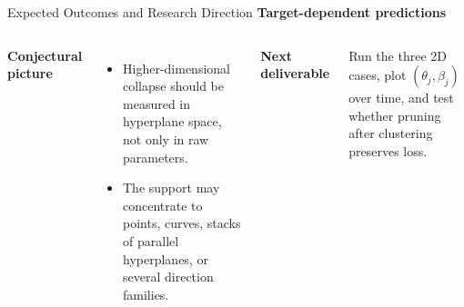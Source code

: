 \documentclass[aspectratio=169,10pt]{beamer}
\begin{document}
\begin{frame}{Expected Outcomes and Research Direction}
\small
\textbf{\textcolor{rtgnavy}{Target-dependent predictions}}

\vspace{0.05cm}
\begin{center}
\end{center}

\vspace{0.12cm}
\begin{columns}[T,onlytextwidth]
\textbf{\textcolor{rtgnavy}{Conjectural picture}}
\begin{itemize}
  \item Higher-dimensional collapse should be measured in hyperplane space, not only in raw parameters.
  \item The support may concentrate to points, curves, stacks of parallel hyperplanes, or several direction families.
\end{itemize}

\textbf{\textcolor{rtgnavy}{Next deliverable}}
\vspace{0.05cm}
\begin{tcolorbox}[slideboxB]
Run the three 2D cases, plot $(\theta_j,\beta_j)$ over time, and test whether pruning after clustering preserves loss.
\end{tcolorbox}
\end{columns}
\end{frame}
\end{document}
